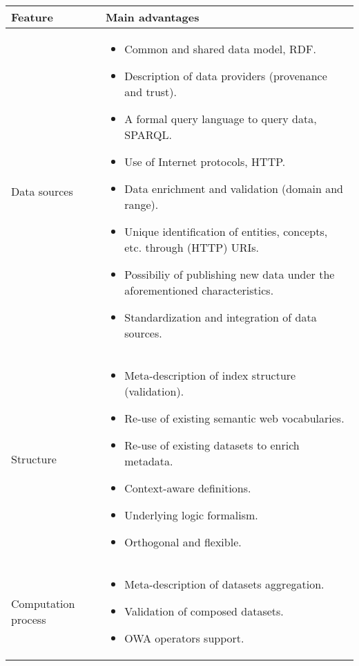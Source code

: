  
\begin{table}[!htb]
\renewcommand{\arraystretch}{1.3}
\begin{center}
\begin{tabular}{|p{3cm}|p{8cm}|}
\hline
  \textbf{Feature} & \textbf{Main advantages}  \\  \hline
  Data sources & \begin{itemize}
                  \item Common and shared data model, RDF.
                  \item Description of data providers (provenance and trust).
                  \item A formal query language to query data, SPARQL.
                  \item Use of Internet protocols, HTTP.
                  \item Data enrichment and validation (domain and range).
                  \item Unique identification of entities, concepts, etc. through (HTTP) URIs.
                  \item Possibiliy of publishing new data under the aforementioned characteristics.
                  \item Standardization and integration of data sources.
                 \end{itemize} \\ \hline  
  Structure &  \begin{itemize}
                  \item Meta-description of index structure (validation).
                  \item Re-use of existing semantic web vocabularies.
                  \item Re-use of existing datasets to enrich metadata.
                  \item Context-aware definitions.
                  \item Underlying logic formalism.                  
                  \item Orthogonal and flexible.                 
                 \end{itemize} \\ \hline  
  Computation process &  \begin{itemize}
                  \item Meta-description of datasets aggregation.
                  \item Validation of composed datasets.
                  \item OWA operators support.

\end{itemize}
\end{tabular}
\end{center}
\end{table}

